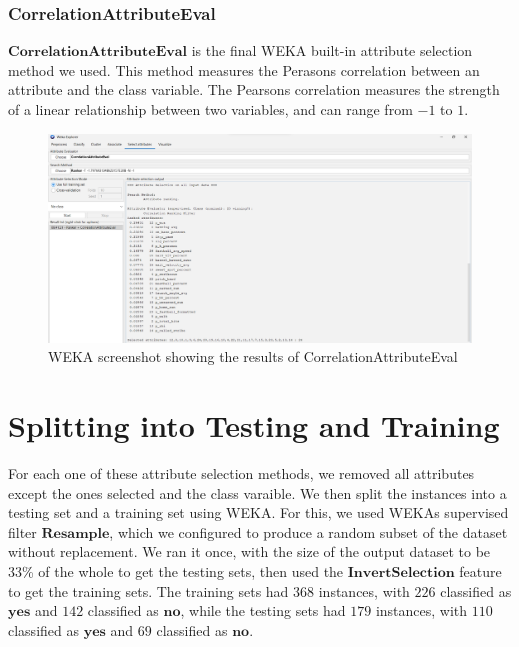\documentclass[12pt]{article}
\begin{document}
\newpage
\subsubsection{CorrelationAttributeEval}
$\textbf{CorrelationAttributeEval}$ is the final WEKA built-in attribute selection method we used. This method measures the Perason\textquotesingle s correlation between an attribute and the class variable. The Pearson\textquotesingle s correlation measures the strength of a linear relationship between two variables, and can range from $-1$ to $1$. 
\begin{figure}[h!]
    \includegraphics[scale=0.4]{./images/CorrelationAttributeEval/CorrelationAttributeEval.png}
    \centering
    \caption{WEKA screenshot showing the results of CorrelationAttributeEval}
    \label{fig:Correlation}
\end{figure}

\section{Splitting into Testing and Training}
For each one of these attribute selection methods, we removed all attributes except the ones selected and the class varaible. We then split the instances into a testing set and a training set using WEKA. For this, we used WEKA\textquotesingle s supervised filter $\textbf{Resample}$, which we configured to produce a random subset of the dataset without replacement. We ran it once, with the size of the output dataset to be 33\% of the whole to get the testing sets, then used the $\textbf{InvertSelection}$ feature to get the training sets. The training sets had $368$ instances, with $226$ classified as $\textbf{yes}$ and $142$ classified as $\textbf{no}$, while the testing sets had $179$ instances, with $110$ classified as $\textbf{yes}$ and $69$ classified as $\textbf{no}$.
\end{document}
